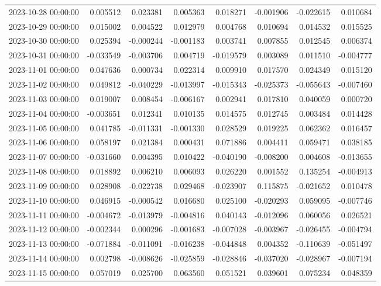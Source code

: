 \begin{tabular}{lrrrrrrr}
2023-10-28 00:00:00 & 0.005512 & 0.023381 & 0.005363 & 0.018271 & -0.001906 & -0.022615 & 0.010684 \\
2023-10-29 00:00:00 & 0.015002 & 0.004522 & 0.012979 & 0.004768 & 0.010694 & 0.014532 & 0.015525 \\
2023-10-30 00:00:00 & 0.025394 & -0.000244 & -0.001183 & 0.003741 & 0.007855 & 0.012545 & 0.006374 \\
2023-10-31 00:00:00 & -0.033549 & -0.003706 & 0.004719 & -0.019579 & 0.003089 & 0.011510 & -0.004777 \\
2023-11-01 00:00:00 & 0.047636 & 0.000734 & 0.022314 & 0.009910 & 0.017570 & 0.024349 & 0.015120 \\
2023-11-02 00:00:00 & 0.049812 & -0.040229 & -0.013997 & -0.015343 & -0.025373 & -0.055643 & -0.007460 \\
2023-11-03 00:00:00 & 0.019007 & 0.008454 & -0.006167 & 0.002941 & 0.017810 & 0.040059 & 0.000720 \\
2023-11-04 00:00:00 & -0.003651 & 0.012341 & 0.010135 & 0.014575 & 0.012745 & 0.003484 & 0.014428 \\
2023-11-05 00:00:00 & 0.041785 & -0.011331 & -0.001330 & 0.028529 & 0.019225 & 0.062362 & 0.016457 \\
2023-11-06 00:00:00 & 0.058197 & 0.021384 & 0.000431 & 0.071886 & 0.004411 & 0.059471 & 0.038185 \\
2023-11-07 00:00:00 & -0.031660 & 0.004395 & 0.010422 & -0.040190 & -0.008200 & 0.004608 & -0.013655 \\
2023-11-08 00:00:00 & 0.018892 & 0.006210 & 0.006093 & 0.026220 & 0.001552 & 0.135254 & -0.004913 \\
2023-11-09 00:00:00 & 0.028908 & -0.022738 & 0.029468 & -0.023907 & 0.115875 & -0.021652 & 0.010478 \\
2023-11-10 00:00:00 & 0.046915 & -0.000542 & 0.016680 & 0.025100 & -0.020293 & 0.059095 & -0.007746 \\
2023-11-11 00:00:00 & -0.004672 & -0.013979 & -0.004816 & 0.040143 & -0.012096 & 0.060056 & 0.026521 \\
2023-11-12 00:00:00 & -0.002344 & 0.000296 & -0.001683 & -0.007028 & -0.003967 & -0.026455 & -0.004794 \\
2023-11-13 00:00:00 & -0.071884 & -0.011091 & -0.016238 & -0.044848 & 0.004352 & -0.110639 & -0.051497 \\
2023-11-14 00:00:00 & 0.002798 & -0.008626 & -0.025859 & -0.028846 & -0.037020 & -0.028967 & -0.007194 \\
2023-11-15 00:00:00 & 0.057019 & 0.025700 & 0.063560 & 0.051521 & 0.039601 & 0.075234 & 0.048359 \\

\end{tabular}
